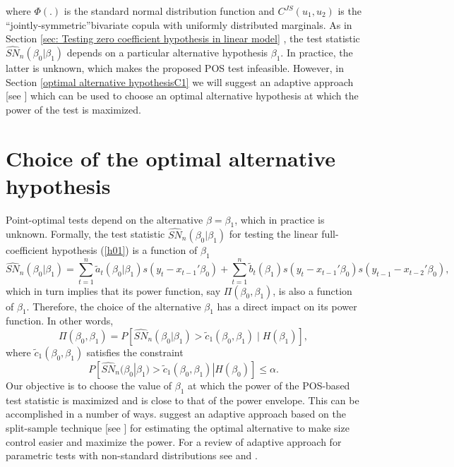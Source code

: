 \documentclass[harvard,11pt]{article}
\begin{document}
where $\Phi(.)$ is the standard normal distribution function and $C^{JS}(u_1,u_2)$ is the \textquotedblleft jointly-symmetric\textquotedblright bivariate copula with uniformly distributed marginals. As in Section \ref{sec: Testing zero coefficient hypothesis in linear model}%
, the test statistic $\widehat{SN}_{n}(\beta _{0}|\beta _{1})$ depends on a
particular alternative hypothesis $\beta _{1}$. In practice, the latter is unknown, which makes the proposed POS test infeasible.
However, in Section \ref{optimal alternative hypothesisC1} we will suggest an
adaptive approach [see \citet{dufour2010exact}] which can be used to
choose an optimal alternative hypothesis at which the
power of the test is maximized.
\section{Choice of the optimal alternative hypothesis \label{optimal
alternative hypothesisC1}}

Point-optimal tests depend on the alternative $\beta=\beta_1$, which in practice is unknown. Formally, the test statistic $\widehat{SN}_{n}(\beta _{0}|\beta _{1})$ for testing the linear full-coefficient hypothesis (\ref{h01}) is a function
of $\beta _{1}$
\begin{equation*}
\widehat{SN}_{n}(\beta _{0}|\beta _{1})=\sum\limits_{t=1}^{n}\tilde{a}%
_{t}(\beta _{0}|\beta _{1})s(y_{t}-x_{t-1}'\beta
_{0})+\sum\limits_{t=1}^{n}\tilde{b}_{t}(\beta _{1})%
s(y_{t}-x_{t-1}'\beta _{0})s(y_{t-1}-x_{t-2}'\beta _{0}),
\end{equation*}%
which in turn implies that its power function, say $\Pi (\beta_0 ,\beta _{1})$, is also a
function of $\beta _{1}$. Therefore, the choice of the alternative $\beta_1$ has a direct impact on its power function. In  other words,
\begin{equation*}
\Pi (\beta_0 ,\beta _{1})=P[\widehat{SN}_{n}(\beta _{0}|\beta _{1})>\tilde{c}%
_{1}(\beta_0,\beta _{1})\mid H(\beta_1)],
\end{equation*}%
where $\tilde{c}_{1}(\beta_0,\beta _{1})$ satisfies the constraint
\begin{equation*}
P[\widehat{SN}_{n}(\beta _{0}|\beta _{1})>\tilde{c}_{1}(\beta_0,\beta _{1})|H(\beta_0)]\leq
\alpha. 
\end{equation*}
Our objective is to choose the value of $\beta_1$ at which the power of the POS-based test statistic is maximized and is close to that of the power envelope. This can be accomplished in a number of ways.
\citet{dufour2010exact} suggest an adaptive approach based on the split-sample technique [see \citet{dufour2001finite}] for estimating the optimal alternative to make size control easier and maximize the power. For a review of adaptive approach for parametric tests with non-standard distributions see \citet{dufour2003point} and \citet{dufour2008finite}.
\end{document}

